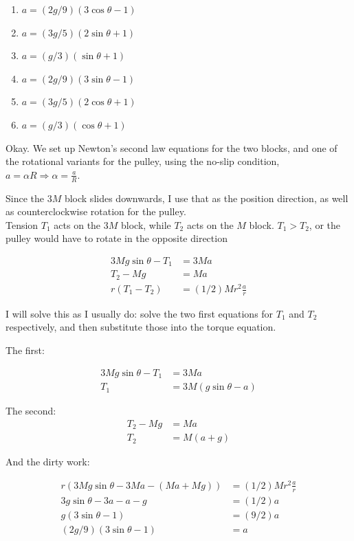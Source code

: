 \documentclass[8.01x]{subfiles}
\begin{document}
\begin{enumerate}
\item $a=(2g/9)(3\cos\theta - 1)$
\item $a=(3g/5)(2\sin\theta + 1)$
\item $a=(g/3)(\sin\theta + 1)$
\item $a=(2g/9)(3\sin\theta - 1)$
\item $a=(3g/5)(2\cos\theta + 1)$
\item $a=(g/3)(\cos\theta + 1)$
\end{enumerate}

Okay. We set up Newton's second law equations for the two blocks, and one of the rotational variants for the pulley, using the no-slip condition, $\displaystyle a = \alpha R \Rightarrow \alpha = \frac{a}{R}$.

Since the $3 M$ block slides downwards, I use that as the position direction, as well as counterclockwise rotation for the pulley.\\
Tension $T_1$ acts on the $3M$ block, while $T_2$ acts on the $M$ block. $T_1 > T_2$, or the pulley would have to rotate in the opposite direction

\begin{align}
3 M g \sin \theta - T_1 &= 3M a\\
T_2 - M g &= M a\\
r(T_1 - T_2) &= (1/2) M r^2 \frac{a}{r}
\end{align}

I will solve this as I usually do: solve the two first equations for $T_1$ and $T_2$ respectively, and then substitute those into the torque equation.

The first:

\begin{align}
3 M g \sin \theta - T_1 &= 3M a\\
T_1 &= 3M (g \sin \theta - a)
\end{align}

The second:
\begin{align}
T_2 - M g &= M a\\
T_2 &= M (a + g)
\end{align}

And the dirty work:

\begin{align}
r(3 M g \sin \theta - 3 M a - (M a + M g)) &= (1/2) M r^2 \frac{a}{r}\\
3 g \sin \theta - 3 a - a - g &= (1/2) a\\
g(3 \sin \theta - 1) &= (9/2) a\\
(2g/9)(3 \sin \theta - 1) &= a\\
\end{align}
\end{document}
